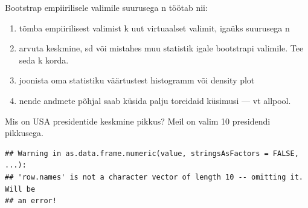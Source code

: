 \documentclass[]{book}
\newenvironment{Shaded}{\begin{snugshade}}{\end{snugshade}}
\newcommand{\KeywordTok}[1]{\textcolor[rgb]{0.13,0.29,0.53}{\textbf{#1}}}
\newcommand{\DataTypeTok}[1]{\textcolor[rgb]{0.13,0.29,0.53}{#1}}
\newcommand{\DecValTok}[1]{\textcolor[rgb]{0.00,0.00,0.81}{#1}}
\newcommand{\StringTok}[1]{\textcolor[rgb]{0.31,0.60,0.02}{#1}}
\newcommand{\CommentTok}[1]{\textcolor[rgb]{0.56,0.35,0.01}{\textit{#1}}}
\newcommand{\OtherTok}[1]{\textcolor[rgb]{0.56,0.35,0.01}{#1}}
\newcommand{\OperatorTok}[1]{\textcolor[rgb]{0.81,0.36,0.00}{\textbf{#1}}}
\newcommand{\NormalTok}[1]{#1}
\providecommand{\tightlist}{%
  \setlength{\itemsep}{0pt}\setlength{\parskip}{0pt}}
\begin{document}
Bootstrap empiirilisele valimile suurusega n töötab nii:

\begin{enumerate}
\def\labelenumi{\arabic{enumi})}
\tightlist
\item
  tõmba empiirilisest valimist k uut virtuaalset valimit, igaüks
  suurusega n
\item
  arvuta keskmine, sd või mistahes muu statistik igale bootstrapi
  valimile. Tee seda k korda.
\item
  joonista oma statistiku väärtustest histogramm või density plot
\item
  nende andmete põhjal saab küsida palju toreidaid küsimusi --- vt
  allpool.
\end{enumerate}

Mis on USA presidentide keskmine pikkus? Meil on valim 10 presidendi
pikkusega.

\begin{Shaded}
\end{Shaded}

\begin{verbatim}
## Warning in as.data.frame.numeric(value, stringsAsFactors = FALSE, ...):
## 'row.names' is not a character vector of length 10 -- omitting it. Will be
## an error!
\end{verbatim}

\begin{Shaded}
\end{Shaded}
\end{document}
